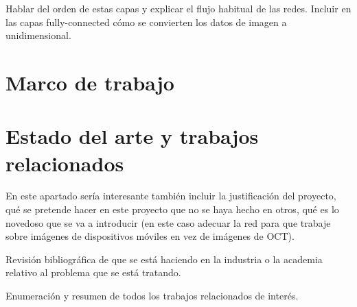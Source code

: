 Hablar del orden de estas capas y explicar el flujo habitual de las redes. Incluir en las capas fully-connected cómo se convierten los datos de imagen a unidimensional.

\section{Marco de trabajo}

\section{Estado del arte y trabajos relacionados}

En este apartado sería interesante también incluir la justificación del proyecto, qué se pretende hacer en este proyecto que no se haya hecho en otros, qué es lo novedoso que se va a introducir (en este caso adecuar la red para que trabaje sobre imágenes de dispositivos móviles en vez de imágenes de OCT).

Revisión bibliográfica de que se está haciendo en la industria o la academia relativo al problema que se está tratando.

Enumeración y resumen de todos los trabajos relacionados de interés.

